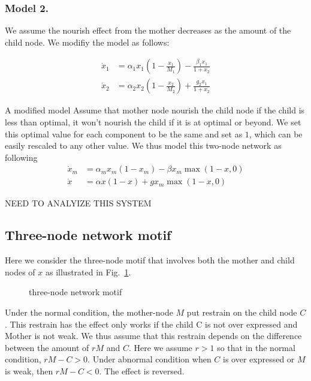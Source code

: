 \documentclass{article}
\begin{document}
\subsubsection{ Model 2.} We assume the nourish effect from the mother decreases as the amount of the child node. We modifiy the model as follows:


\begin{equation}
\begin{array}{rl}
    \dot x_1  & = \alpha_1 x_1(1-\frac{x_1}{M_1}) - \frac{\beta_1 x_1}{1+x_2}   \\
     \dot x_2 &= \alpha_2 x_2 (1-\frac{x_2}{M_2}) + \frac{g_2 x_1}{1+x_2}
\end{array}
\end{equation}

A modified model
Assume that mother node nourish the child node if the child is less than optimal, it won't nourish the child if it is at optimal or beyond. We set this optimal value for each component to be the same and set as $1$, which can be easily rescaled to any other value. We thus model this two-node network as following
\begin{equation}
\begin{array}{rl}
    \dot x_m  & = \alpha_m x_m(1-x_m) - \beta x_m\max(1-x, 0)   \\
     \dot x &= \alpha x(1-x) + g x_m\max(1-x, 0) 
\end{array}
\end{equation}

    NEED TO ANALYIZE THIS SYSTEM
\subsection{Three-node network motif}
Here we consider the three-node motif that involves both the mother and child nodes of $x$ as illustrated in Fig.~\ref{F:three-node}.
\begin{figure}[!htb]
\centering
 \caption{three-node network motif}
 \label{F:three-node}
\end{figure}
Under the normal condition, the mother-node $M$ put restrain on the child node $C$. This restrain has the effect only works if the child C is not over expressed and Mother is not weak. We thus assume that this restrain depends on the difference between the amount of $r M$ and $C$. Here we assume $r>1$ so that in the normal condition, $rM-C >0$. Under abnormal condition when $C$ is over expressed or $M$ is weak, then $rM-C<0$. 
The effect is reversed.
\end{document}
